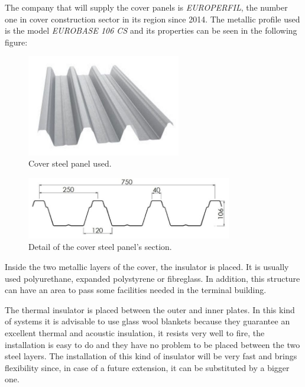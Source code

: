 The company that will supply the cover panels is \textit{EUROPERFIL}, the number one in cover construction sector in its region since 2014. The metallic profile used is the model \textit{EUROBASE 106 CS} and its properties can be seen in the following figure:

\begin{figure}[H]
	\centering
	\includegraphics[clip, trim=0cm 0cm 0cm 0cm, width=0.6\textwidth]{./images/cover/profile}
	\caption{Cover steel panel used.}
	\label{profile}
\end{figure}

\begin{figure}[H]
	\centering
	\includegraphics[clip, trim=0cm 0cm 0cm 0cm, width=0.8\textwidth]{./images/cover/profiledimension}
	\caption{Detail of the cover steel panel's section.}
	\label{profiledimension}
\end{figure}

Inside the two metallic layers of the cover, the insulator is placed. It is usually used polyurethane, expanded polystyrene or fibreglass. In addition, this structure can have an area to pass some facilities needed in the terminal building.

The thermal insulator is placed between the outer and inner plates. In this kind of systems it is advisable to use glass wool blankets because they guarantee an excellent thermal and acoustic insulation, it resists very well to fire, the installation is easy to do and they have no problem to be placed between the two steel layers. The installation of this kind of insulator will be very fast and brings flexibility since, in case of a future extension, it can be substituted by a bigger one.

